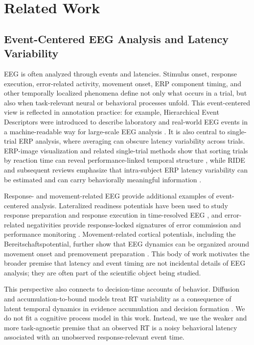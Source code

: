 \documentclass[12pt]{article}
\begin{document}
\section{Related Work}

\subsection{Event-Centered EEG Analysis and Latency Variability}
EEG is often analyzed through events and latencies. Stimulus onset, response execution, error-related activity, movement onset, ERP component timing, and other temporally localized phenomena define not only what occurs in a trial, but also when task-relevant neural or behavioral processes unfold. This event-centered view is reflected in annotation practice: for example, Hierarchical Event Descriptors were introduced to describe laboratory and real-world EEG events in a machine-readable way for large-scale EEG analysis \citep{BigdelyShamlo2016HED}. It is also central to single-trial ERP analysis, where averaging can obscure latency variability across trials. ERP-image visualization and related single-trial methods show that sorting trials by reaction time can reveal performance-linked temporal structure \citep{Jung1998SingleTrialERP}, while RIDE and subsequent reviews emphasize that intra-subject ERP latency variability can be estimated and can carry behaviorally meaningful information \citep{Ouyang2011RIDE,Ouyang2017LatencyReview}.

Response- and movement-related EEG provide additional examples of event-centered analysis. Lateralized readiness potentials have been used to study response preparation and response execution in time-resolved EEG \citep{Coles1989LRP}, and error-related negativities provide response-locked signatures of error commission and performance monitoring \citep{Gehring1993ErrorDetection,HolroydColes2002ERN}. Movement-related cortical potentials, including the Bereitschaftspotential, further show that EEG dynamics can be organized around movement onset and premovement preparation \citep{KornhuberDeecke1965BP,ShibasakiHallett2006BP}. This body of work motivates the broader premise that latency and event timing are not incidental details of EEG analysis; they are often part of the scientific object being studied.

This perspective also connects to decision-time accounts of behavior. Diffusion and accumulation-to-bound models treat RT variability as a consequence of latent temporal dynamics in evidence accumulation and decision formation \citep{Ratcliff2008Diffusion,OConnell2012Supramodal,Kelly2013Internal}. We do not fit a cognitive process model in this work. Instead, we use the weaker and more task-agnostic premise that an observed RT is a noisy behavioral latency associated with an unobserved response-relevant event time.
\end{document}
